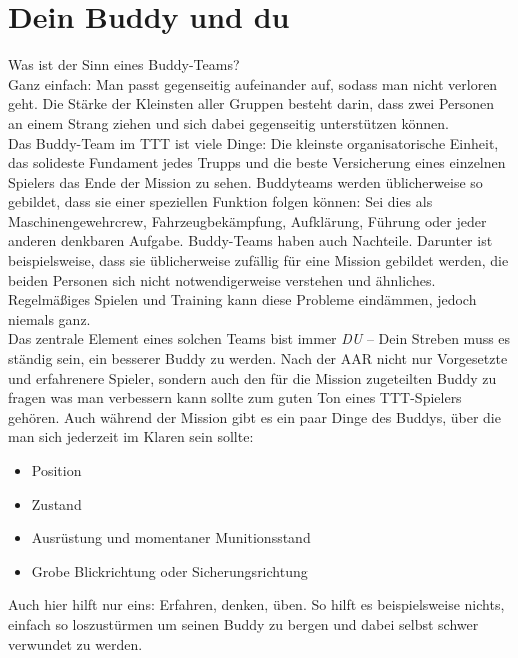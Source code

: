 \pagebreak
\section{Dein Buddy und du}
	Was ist der Sinn eines Buddy-Teams?\\
	Ganz einfach: Man passt gegenseitig aufeinander auf, sodass man nicht verloren geht. Die Stärke der Kleinsten aller Gruppen besteht darin, dass zwei Personen an einem Strang ziehen und sich dabei gegenseitig unterstützen können.\\
	Das Buddy-Team im \ac{TTT} ist viele Dinge: Die kleinste organisatorische Einheit, das solideste Fundament jedes Trupps und die beste Versicherung eines einzelnen Spielers das Ende der Mission zu sehen. Buddyteams werden üblicherweise so gebildet, dass sie einer speziellen Funktion folgen können: Sei dies als Maschinengewehrcrew, Fahrzeugbekämpfung, Aufklärung, Führung oder jeder anderen denkbaren Aufgabe. Buddy-Teams haben auch Nachteile. Darunter ist beispielsweise, dass sie üblicherweise zufällig für eine Mission gebildet werden, die beiden Personen sich nicht notwendigerweise verstehen und ähnliches. Regelmäßiges Spielen und Training kann diese Probleme eindämmen, jedoch niemals ganz.\\
	Das zentrale Element eines solchen Teams bist immer \textit{DU} -- Dein Streben muss es ständig sein, ein besserer Buddy zu werden. Nach der AAR nicht nur Vorgesetzte und erfahrenere Spieler, sondern auch den für die Mission zugeteilten Buddy zu fragen was man verbessern kann sollte zum guten Ton eines \ac{TTT}-Spielers gehören. Auch während der Mission gibt es ein paar Dinge des Buddys, über die man sich jederzeit im Klaren sein sollte:
		\begin{itemize}
			\item Position
			\item Zustand
			\item Ausrüstung und momentaner Munitionsstand
			\item Grobe Blickrichtung oder Sicherungsrichtung
		\end{itemize}
	Auch hier hilft nur eins: Erfahren, denken, üben. So hilft es beispielsweise nichts, einfach so loszustürmen um seinen Buddy zu bergen und dabei selbst schwer verwundet zu werden. 